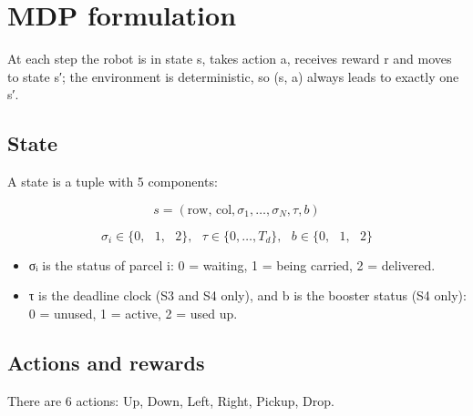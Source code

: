 \documentclass[12pt,a4paper]{article}
\begin{document}
\hypertarget{mdp-formulation}{%
\section{MDP formulation}\label{mdp-formulation}}

At each step the robot is in state s, takes action a, receives reward r
and moves to state s′; the environment is deterministic, so (s, a)
always leads to exactly one s′.

\hypertarget{state}{%
\subsection{State}\label{state}}

A state is a tuple with 5 components:

\[s = \left( \text{row, col},\sigma_{1},\ldots,\sigma_{N},\tau,b \right)\]

\[\sigma_{i} \in \{ 0,\text{ }1,\text{ }2\},\text{     }\tau \in \{ 0,\ldots,T_{d}\},\text{     }b \in \{ 0,\text{ }1,\text{ }2\}\]

\begin{itemize}
\item
  σᵢ is the status of parcel i: 0 = waiting, 1 = being carried, 2 =
  delivered.
\item
  τ is the deadline clock (S3 and S4 only), and b is the booster status
  (S4 only): 0 = unused, 1 = active, 2 = used up.
\end{itemize}

\hypertarget{actions-and-rewards}{%
\subsection{Actions and rewards}\label{actions-and-rewards}}

There are 6 actions: Up, Down, Left, Right, Pickup, Drop.
\end{document}
